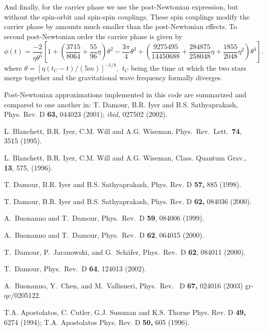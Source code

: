 And finally, for the carrier phase we use the post-Newtonian 
expression, but without the spin-orbit and
spin-spin couplings. These spin couplings modify the carrier phase 
by amounts much smaller than the post-Newtonian effects.
To second post-Newtonian order the carrier phase is given by
\begin{equation}
\phi(t) = 
\frac{-2}{\eta\theta^5}\left[1+\left(\frac{3715}{8064}+\frac
{55}{96}\eta\right)\theta^2-\frac{3\pi}{4}\theta^3 
+\left(\frac{9275495}{14450688}+\frac{284875}{258048}\eta+\frac{1855}{2048}\eta^2\right)\theta^4\right].
\label{eqn:phi}
\end{equation}
where $\theta=[\eta (t_C-t)/(5m)]^{-1/8},$ $t_C$ being the time at which the two stars
merge together and the gravitational wave frequency formally diverges.


\newpage
\begin{thebibliography}{}
 Post-Newtonian approximations implemented in this code are 
summarized and compared to one another in: 
T. Damour, B.R. Iyer and B.S. Sathyaprakash, 
Phys. Rev. D {\bf 63,} 044023 (2001); {\em ibid,} 027502 (2002).

L. Blanchett, B.R. Iyer, C.M. Will and A.G. Wiseman, 
Phys.\ Rev.\ Lett.\ {\bf 74}, 3515 (1995).

L. Blanchett, B.R. Iyer, C.M. Will and A.G. Wiseman, 
Class. Quantum Grav., {\bf 13}, 575, (1996).

 T. Damour, B.R. Iyer and B.S. Sathyaprakash, 
Phys. Rev. D {\bf 57,} 885 (1998). 

 T. Damour, B.R. Iyer and B.S. Sathyaprakash, 
Phys. Rev. D {\bf 62,} 084036 (2000). 

A.\ Buonanno and T.\ Damour,
Phys.\ Rev.\ D {\bf 59}, 084006 (1999).

A.\ Buonanno and T.\ Damour,
Phys.\ Rev.\ D {\bf 62}, 064015 (2000). 

T.\ Damour, P.\ Jaranowski, and G.\ Sch\"afer,
Phys.\ Rev.\ D {\bf 62}, 084011 (2000).

T.\ Damour,
Phys.\ Rev.\ D {\bf 64}, 124013 (2002).

A.\ Buonanno, Y.\ Chen, and M.\ Vallisneri,
Phys.\ Rev. \ D {\bf 67,} 024016 (2003)
gr-qc/0205122.

T.A. Apostolatos, C. Cutler, G.J. Sussman
and K.S. Thorne Phys. Rev. D {\bf 49,} 6274 (1994);
T.A. Apostolatos Phys. Rev. D {\bf 50,} 605 (1996).

\end{thebibliography}
